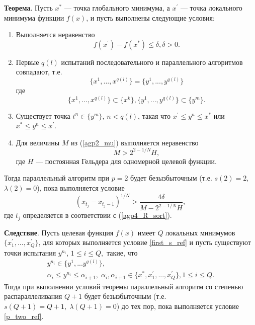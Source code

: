 \documentclass[10pt,a4paper]{book}
\begin{document}
\textbf{Теорема}. Пусть $x^*$ --- точка глобального минимума, а $x^{\prime}$ --- точка локального минимума функции $f(x)$, и пусть выполнены следующие условия:
    \begin{enumerate}
        \item Выполняется неравенство
            \begin{equation} \label{first_s_ref}
                f(x^{\prime}) - f(x^*) \leq \delta, \delta > 0.
            \end{equation}
        \item Первые $q(l)$ испытаний последовательного и параллельного алгоритмов совпадают, т.е.
            \begin{equation} \label{second_s_ref}
                \{x^1,...,x^{q(l)}\} = \{y^1,...,y^{q(l)}\}
            \end{equation}
        где
            \begin{equation} \label{third_s_ref}
                \{x^1,...,x^{q(l)}\} \subset \{x^k\}, \{y^1,...,y^{q(l)}\}\subset \{y^m\}.
            \end{equation}
        \item Существует точка $t^n \in \{y^m\}$, $n < q(l)$, такая что $x^{\prime} \leq y^n \leq x^*$ или $x^* \leq y^n \leq x^{\prime}$.
        \item Для величины $M$ из (\ref{agp2_mu}) выполняется неравенство 
            \begin{equation} \label{fourth_s_ref}
                M > 2^{2 - 1/N} H,
            \end{equation}
        где $H$ --- постоянная Гельдера для одномерной целевой функции.
    \end{enumerate}
Тогда параллельный алгоритм при $p=2$ будет безызбыточным (т.е. $s(2)=2$, $\lambda(2)=0$), пока выполняется условие
\begin{equation} \label{p_two_ref}
    (x_{t_j} - x_{t_j - 1})^{1/N} > \frac{4\delta}{M - 2^{2 - 1/N} H},
\end{equation}
где $t_j$ определяется в соответствии с (\ref{agp4_R_sort}).

\textbf{Следствие}. Пусть целевая функция $f(x)$ имеет $Q$ локальных минимумов $\{x_1^{\prime},...,x_Q^{\prime}\}$, для которых выполняется условие \eqref{first_s_ref} и пусть существуют точки испытания $y^{n_i}$, $1 \leq i \leq Q,$ такие, что 
\begin{gather} 
    y^{n_i} \in \{y^1,...y^{q(l)}\}, \nonumber \\ 
    \alpha_i \leq y^{n_i} \leq \alpha_{i+1}, \; \alpha_i, \alpha_{i+1} \in \{x^*, x_1^{\prime},...,x_Q^{\prime}\}, 1 \leq i \leq Q. \nonumber
\end{gather}
Тогда при выполнении условий теоремы параллельный алгоритм со степенью распараллеливания $Q+1$ будет безызбыточным (т.е. $s(Q+1)=Q+1, \; \lambda(Q+1) =0$) до тех пор, пока выполняется условие \eqref{p_two_ref}.
\end{document}
